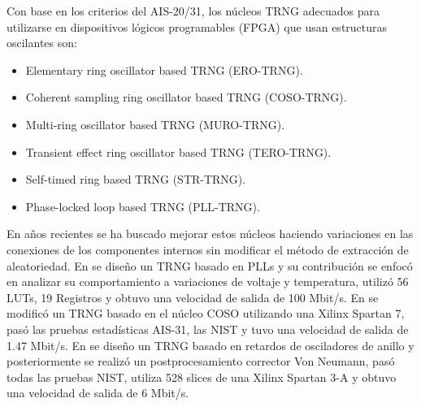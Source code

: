     Con base en los criterios del AIS-20/31, los núcleos TRNG adecuados para utilizarse en dispositivos lógicos programables (FPGA) que usan estructuras oscilantes son:

        \begin{itemize}
            \item Elementary ring oscillator based TRNG (ERO-TRNG).
            \item Coherent sampling ring oscillator based TRNG (COSO-TRNG).
            \item Multi-ring oscillator based TRNG (MURO-TRNG).
            \item Transient effect ring oscillator based TRNG (TERO-TRNG).
            \item Self-timed ring based TRNG  (STR-TRNG).
            \item Phase-locked loop based TRNG (PLL-TRNG).
        \end{itemize}

    En años recientes se ha buscado mejorar estos núcleos haciendo variaciones en las conexiones de los componentes internos sin modificar el método de extracción de aleatoriedad. En \cite{Wang2021} se diseño un TRNG basado en PLLs y su contribución se enfocó en analizar su comportamiento a variaciones de voltaje y temperatura, utilizó 56 LUTs, 19 Registros y obtuvo una velocidad de salida de 100 Mbit/s. En \cite{Peetermans2021} se modificó un TRNG basado en el núcleo COSO utilizando una Xilinx Spartan 7, pasó las pruebas estadísticas AIS-31, las NIST y tuvo una velocidad de salida de 1.47 Mbit/s. En \cite{Anandakumar2020} se diseño un TRNG basado en retardos de osciladores de anillo y posteriormente se realizó un postprocesamiento corrector Von Neumann, pasó todas las pruebas NIST, utiliza 528 slices de una Xilinx Spartan 3-A y obtuvo una velocidad de salida de 6 Mbit/s.

